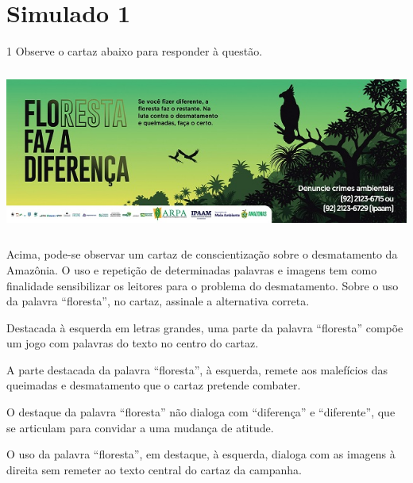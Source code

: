 \pagebreak

\mbox{}



\pagebreak

\section*{Simulado 1}

\num{1} Observe o cartaz abaixo para responder à questão.

\includegraphics[width=5.90551in,height=2.125in]{./imgSAEB_7_POR/media/image16.png}


Acima, pode-se observar um cartaz de conscientização sobre o desmatamento da
Amazônia. O uso e repetição de determinadas palavras e imagens tem como
finalidade sensibilizar os leitores para o problema do desmatamento.
Sobre o uso da palavra ``floresta'', no cartaz, assinale a alternativa
correta.

\begin{escolha}

  \item Destacada à esquerda em letras grandes, uma parte da palavra ``floresta'' compõe um jogo com 
  palavras do texto no centro do cartaz.   

  \item A parte destacada da palavra ``floresta'', à esquerda, remete aos malefícios das queimadas e desmatamento
  que o cartaz pretende combater. 

  \item O destaque da palavra ``floresta'' não dialoga com ``diferença'' e ``diferente'', que se articulam para convidar a uma mudança de atitude.

  \item O uso da palavra ``floresta'', em destaque, à esquerda, dialoga com as imagens à direita sem remeter ao texto central do cartaz da campanha. 

\end{escolha}


